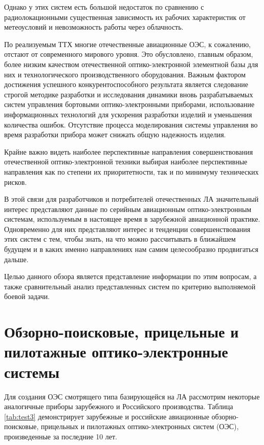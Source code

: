 Однако у этих систем есть большой недостаток по сравнению с радиолокационными существенная зависимость их рабочих характеристик от метеоусловий и невозможность работы через облачность. 

По реализуемым ТТХ многие отечественные авиационные ОЭС, к сожалению, отстают от современного мирового уровня. Это обусловлено, главным образом, более низким качеством отечественной оптико-электронной элементной базы для них и технологического производственного оборудования. Важным фактором достижения успешного конкурентоспособного результата является следование строгой методике разработки и исследования динамики вновь разрабатываемых систем управления бортовыми оптико-электронными приборами, использование информационных технологий для ускорения разработки изделий и уменьшения количества ошибок. Отсутствие процесса моделирования системы управления во время разработки прибора может снижать общую надежность изделия.

Крайне важно видеть наиболее перспективные направления совершенствования отечественной оптико-электронной техники выбирая наиболее перспективные направления как по степени их приоритетности, так и по минимуму технических рисков. 

В этой связи для разработчиков и потребителей отечественных ЛА значительный интерес представляют данные по серийным авиационным оптико-электронным системам, используемым в настоящее время в зарубежной авиационной практике. Одновременно для них представляют интерес и тенденции совершенствования этих систем с тем, чтобы знать, на что можно рассчитывать в ближайшем будущем и в каких именно направлениях нам самим целесообразно продвигаться дальше. 

Целью данного обзора является представление информации по этим вопросам, а также сравнительный анализ представленных систем по критерию выполняемой боевой задачи. 

\section{Обзорно-поисковые, прицельные и пилотажные оптико-электронные системы} \label{sec:ch1/sec1-}

Для создания ОЭС смотрящего типа базирующейся на ЛА рассмотрим некоторые аналогичные приборы зарубежного и Российского производства. Таблица \ref{tab:test3} демонстрирует зарубежные и российские авиационные обзорно-поисковые, прицельных и пилотажных оптико-электронных систем (ОЭС), произведенные за последние 10 лет. 

